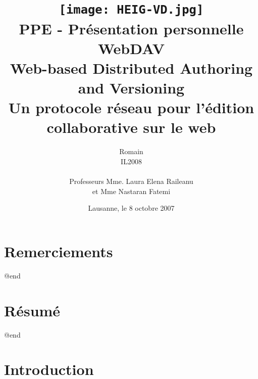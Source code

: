 \documentclass[a4paper, 11pt]{article}
\title{\texttt{[image: HEIG-VD.jpg]} \\ \vspace{4cm}
\small{PPE - Présentation personnelle} \\ \vspace{2cm}
\huge{WebDAV} \\ \vspace{1cm} 
Web-based Distributed Authoring and Versioning \\ 
\small{Un protocole réseau pour l'édition collaborative sur le web}}
\author{Romain \bsc{de
Wolff} \\ IL2008 \\ \vspace{2cm} \\ Professeurs Mme. Laura Elena Raileanu \\ et Mme Nastaran Fatemi \vspace{2cm} 
}
\date{Lausanne, le 8 octobre 2007}  %
\begin{document}
\maketitle
\thispagestyle{empty} %
\newpage
 \setcounter{page}{1} 

{\setlength{\baselineskip}{1.2\baselineskip}
\parskip=12pt

\section*{Remerciements} 

@end

\section*{Résumé}

@end



\newpage
\tableofcontents
\newpage
 \setcounter{page}{1} 

\section{Introduction}

}
\end{document}
